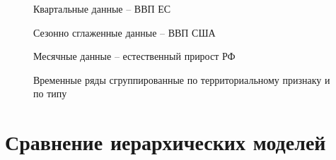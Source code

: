 \documentclass[12pt,a4paper, oneside]{extreport}
\begin{document}
\begin{figure}[H]
	\caption{Временные ряды сгруппированные по территориальному признаку и  по типу }
	\label{qwe}
	
	\centering\footnotesize{Квартальные данные -- ВВП ЕС  }
	
	\begin{minipage}[H]{0.4\linewidth}
	\end{minipage}
	\begin{minipage}[H]{0.4\linewidth}
	\end{minipage}
	
	
	\centering\footnotesize{Сезонно сглаженные данные -- ВВП США}
	
	\begin{minipage}[H]{0.4\linewidth}
	\end{minipage}
	\begin{minipage}[H]{0.4\linewidth}
	\end{minipage}
	
	
	\centering\footnotesize{Месячные данные -- естественный прирост РФ  }
	
	\begin{minipage}[H]{0.4\linewidth}
	\end{minipage}
	\begin{minipage}[H]{0.4\linewidth}
	\end{minipage}
\end{figure}
\newpage



\chapter[Сравнение иерархических моделей]{Сравнение иерархических моделей}\label{app-b}
\end{document}
